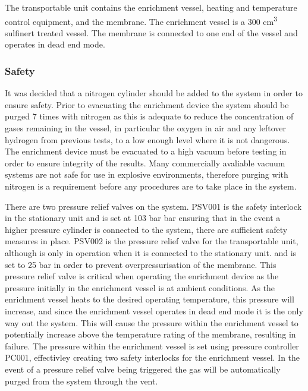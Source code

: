 The transportable unit contains the enrichment vessel, heating and temperature control equipment, and the membrane. The enrichment vessel is a 300 cm\textsuperscript{3} sulfinert \cite{sulfinerttreatedsamplecylinder} treated vessel. The membrane is connected to one end of the vessel and operates in dead end mode. 

\subsubsection*{Safety}
It was decided that a nitrogen cylinder should be added to the system in order to ensure safety. Prior to evacuating the enrichment device the system should be purged 7 times with nitrogen  as this is adequate to reduce the concentration of gases remaining in the vessel, in particular the oxygen in air and any leftover hydrogen from previous tests, to a low enough level where it is not dangerous. \cite{BACQUART20205565} The enrichment device must be evacuated to a high vacuum before testing in order to ensure integrity of the results. Many commercially avaliable vacuum systems are not safe for use in explosive environments, therefore purging with nitrogen is a requirement before any procedures are to take place in the system. 

There are two pressure relief valves on the system. PSV001 is the safety interlock in the stationary unit and is set at 103 bar bar ensuring that in the event a higher pressure cylinder is connected to the system, there are sufficient safety measures in place. PSV002 is the pressure relief valve for the transportable unit, although is only in operation when it is connected to the stationary unit. and is set to 25 bar in order to prevent overpressurisation of the membrane. This pressure relief valve is critical when operating the enrichment device as the pressure initially in the enrichment vessel is at ambient conditions. As the enrichment vessel heats to the desired operating temperature, this pressure will increase, and since the enrichment vessel operates in dead end mode it is the only way out the system. This will cause the pressure within the enrichment vessel to potentially increase above the temperature rating of the membrane, resulting in failure. The pressure within the enrichment vessel is set using pressure controller PC001, effectivley creating two safety interlocks for the enrichment vessel. In the event of a pressure relief valve being triggered the gas will be automatically purged from the system through the vent.

